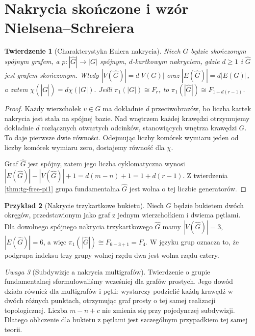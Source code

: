 \documentclass[11pt,a4paper]{report}
\numberwithin{equation}{section}
\theoremstyle{plain}
\newtheorem{twierdzenie}{Twierdzenie}[section]
\theoremstyle{definition}
\newtheorem{przyklad}[twierdzenie]{Przykład}
\theoremstyle{remark}
\newtheorem{uwaga}[twierdzenie]{Uwaga}
\begin{document}
\section{Nakrycia skończone i wzór Nielsena--Schreiera}
\label{sec:tg-finite-cover}

\begin{twierdzenie}[Charakterystyka Eulera nakrycia]
Niech $G$ będzie skończonym spójnym grafem, a
$p:|\widehat G|\to|G|$ spójnym, $d$-kartkowym nakryciem,
gdzie $d\ge1$ i $\widehat G$ jest grafem skończonym.
Wtedy $|V(\widehat G)|=d|V(G)|$ oraz
$|E(\widehat G)|=d|E(G)|$, a zatem
$\chi(|\widehat G|)=d\chi(|G|)$.
Jeśli $\pi_1(|G|)\cong F_r$, to
$\pi_1(|\widehat G|)\cong F_{1+d(r-1)}$.
\end{twierdzenie}

\begin{proof}
Każdy wierzchołek $v\in G$ ma dokładnie $d$ przeciwobrazów,
bo liczba kartek nakrycia jest stała na spójnej bazie.
Nad wnętrzem każdej krawędzi otrzymujemy dokładnie $d$
rozłącznych otwartych odcinków, stanowiących wnętrza
krawędzi $\widehat G$. To daje pierwsze dwie równości.
Odejmując liczby komórek wymiaru jeden od liczby
komórek wymiaru zero, dostajemy równość dla $\chi$.

Graf $\widehat G$ jest spójny, zatem jego liczba cyklomatyczna
wynosi
$|E(\widehat G)|-|V(\widehat G)|+1
=d(m-n)+1=1+d(r-1)$.
Z twierdzenia \ref{thm:tg-free-pi1} grupa fundamentalna
$\widehat G$ jest wolna o tej liczbie generatorów.
\end{proof}

\begin{przyklad}[Nakrycie trzykartkowe bukietu]
Niech $G$ będzie bukietem dwóch okręgów, przedstawionym jako
graf z jednym wierzchołkiem i dwiema pętlami. Dla dowolnego
spójnego nakrycia trzykartkowego $\widehat G$ mamy
$|V(\widehat G)|=3$, $|E(\widehat G)|=6$, a więc
$\pi_1(|\widehat G|)\cong F_{6-3+1}=F_4$.
W języku grup oznacza to, że podgrupa indeksu trzy
grupy wolnej rzędu dwa jest wolna rzędu cztery.
\end{przyklad}

\begin{uwaga}[Subdywizje a nakrycia multigrafów]
Twierdzenie o grupie fundamentalnej sformułowaliśmy wcześniej
dla grafów prostych. Jego dowód działa również dla multigrafów
i pętli: wystarczy podzielić każdą krawędź w dwóch różnych
punktach, otrzymując graf prosty o tej samej realizacji
topologicznej. Liczba $m-n+c$ nie zmienia się przy pojedynczej
subdywizji. Dlatego obliczenie dla bukietu z pętlami
jest szczególnym przypadkiem tej samej teorii.
\end{uwaga}
\end{document}
